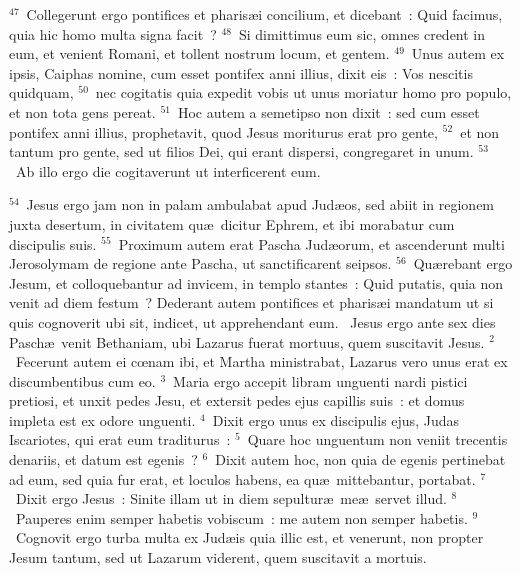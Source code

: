 ${}^{47}$~Collegerunt ergo pontifices et pharis\ae i concilium, et dicebant~: Quid facimus, quia hic homo multa signa facit~?
${}^{48}$~Si dimittimus eum sic, omnes credent in eum, et venient Romani, et tollent nostrum locum, et gentem.
${}^{49}$~Unus autem ex ipsis, Caiphas nomine, cum esset pontifex anni illius, dixit eis~: Vos nescitis quidquam,
${}^{50}$~nec cogitatis quia expedit vobis ut unus moriatur homo pro populo, et non tota gens pereat.
${}^{51}$~Hoc autem a semetipso non dixit~: sed cum esset pontifex anni illius, prophetavit, quod Jesus moriturus erat pro gente,
${}^{52}$~et non tantum pro gente, sed ut filios Dei, qui erant dispersi, congregaret in unum.
${}^{53}$~Ab illo ergo die cogitaverunt ut interficerent eum.


${}^{54}$~Jesus ergo jam non in palam ambulabat apud Jud\ae os, sed abiit in regionem juxta desertum, in civitatem qu\ae\ dicitur Ephrem, et ibi morabatur cum discipulis suis.
${}^{55}$~Proximum autem erat Pascha Jud\ae orum, et ascenderunt multi Jerosolymam de regione ante Pascha, ut sanctificarent seipsos.
${}^{56}$~Qu\ae rebant ergo Jesum, et colloquebantur ad invicem, in templo stantes~: Quid putatis, quia non venit ad diem festum~? Dederant autem pontifices et pharis\ae i mandatum ut si quis cognoverit ubi sit, indicet, ut apprehendant eum.
~Jesus ergo ante sex dies Pasch\ae\ venit Bethaniam, ubi Lazarus fuerat mortuus, quem suscitavit Jesus.
${}^{2}$~Fecerunt autem ei cœnam ibi, et Martha ministrabat, Lazarus vero unus erat ex discumbentibus cum eo.
${}^{3}$~Maria ergo accepit libram unguenti nardi pistici pretiosi, et unxit pedes Jesu, et extersit pedes ejus capillis suis~: et domus impleta est ex odore unguenti.
${}^{4}$~Dixit ergo unus ex discipulis ejus, Judas Iscariotes, qui erat eum traditurus~:
${}^{5}$~Quare hoc unguentum non veniit trecentis denariis, et datum est egenis~?
${}^{6}$~Dixit autem hoc, non quia de egenis pertinebat ad eum, sed quia fur erat, et loculos habens, ea qu\ae\ mittebantur, portabat.
${}^{7}$~Dixit ergo Jesus~: Sinite illam ut in diem sepultur\ae\ me\ae\ servet illud.
${}^{8}$~Pauperes enim semper habetis vobiscum~: me autem non semper habetis.
${}^{9}$~Cognovit ergo turba multa ex Jud\ae is quia illic est, et venerunt, non propter Jesum tantum, sed ut Lazarum viderent, quem suscitavit a mortuis.


